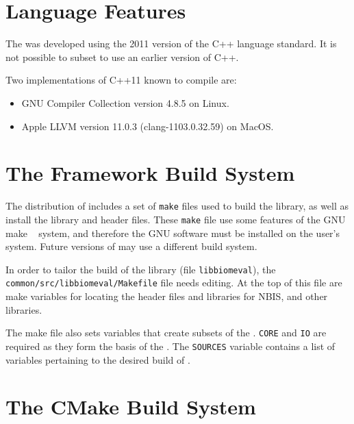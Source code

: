%
%
\section{Language Features}

The \lname was developed using the 2011 version of the C++ language standard.
It is not possible to subset \sname to use an earlier version of C++.

Two implementations of C++11 known to compile \sname are:
\begin{itemize}
\item GNU Compiler Collection version 4.8.5 on Linux.
\item Apple LLVM version 11.0.3 (clang-1103.0.32.59) on MacOS.
\end{itemize}

\section{The Framework Build System}

The distribution of \sname includes a set of \texttt{make} files used to build
the \sname library, as well as install the library and header files. These
\texttt{make} file use some features of the GNU make ~\cite{gnumake}
system, and therefore the GNU software must be installed on the user's system.
Future versions of \sname may use a different build system.

In order to tailor the build of the \sname library (file \texttt{libbiomeval}),
the \texttt{common/src/libbiomeval/Makefile} file needs editing. At the top of
this file are make variables for locating the header files and libraries for
NBIS, and other libraries.

The make file also sets variables that create subsets of the \sname.
\texttt{CORE} and \texttt{IO} are required as they form the basis of the
\sname. The \texttt{SOURCES} variable contains a list of variables pertaining
to the desired build of \sname.

\section{The CMake Build System}

